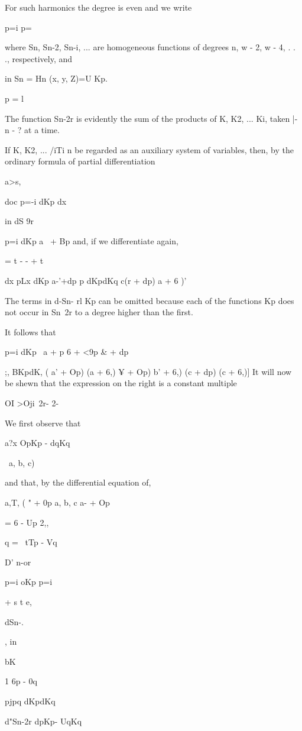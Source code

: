 {%
%

For such harmonics the degree is even and we write

p=i p=\

where Sn, Sn-2, Sn-i, ... are homogeneous functions of degrees n, w
- 2, w - 4, . . ., respectively, and

in Sn = Hn (x, y, Z)=U Kp.

p = l

The function Sn-2r is evidently the sum of the products of K, K2, ...
Ki, taken |- n - ? at a time.

If K, K2, ... /iTi n be regarded as an auxiliary system of variables,
then, by the ordinary formula of partial differentiation

a>s,

doc p=-i dKp dx

in dS 9r

p=i dKp a~ + Bp and, if we differentiate again,

= t - - + t

dx pLx dKp a-'+dp p dKpdKq c(r + dp) a + 6 )'

The terms in d-Sn- rl Kp can be omitted because each of the functions
Kp does not occur in Sn\ 2r to a degree higher than the first.

It follows that

p=i dKp \ a + p 6 + <9p \& + dp\

;, BKpdK, ( a' + Op) (a + 6,) ¥ + Op) b' + 6,) (c + dp) (c + 6,)] It
will now be shewn that the expression on the right is a constant
multiple

OI >Oji\ 2r- 2-

We first observe that

a?x OpKp - dqKq

\ a, b, c)

and that, by the differential equation of,

a,T, ( " + 0p a, b, c a- + Op

= 6 - Up 2,,

q = \ tTp - Vq

%
%

D' n-or

p=i oKp p=i

+ s t e,

dSn-.

, in

bK

1 6p - 0q

pjpq dKpdKq

d"Sn-2r dpKp- UqKq

}
